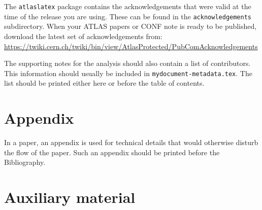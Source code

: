 \documentclass[UKenglish,texlive=2013]{latex/atlasdoc}
\begin{document}
%

The \texttt{atlaslatex} package contains the acknowledgements that were valid 
at the time of the release you are using. These can be found in the
\texttt{acknowledgements} subdirectory.
When your ATLAS papers or CONF note is ready to be published,
download the latest set of acknowledgements from:\\
\url{https://twiki.cern.ch/twiki/bin/view/AtlasProtected/PubComAcknowledgements}

The supporting notes for the analysis should also contain a list of contributors.
This information should usually be included in \texttt{mydocument-metadata.tex}.
The list should be printed either here or before the table of contents.


\clearpage
\appendix
\part*{Appendix}

In a paper, an appendix is used for technical details that would otherwise disturb the flow of the paper.
Such an appendix should be printed before the Bibliography.


\printbibliography
%
%

\clearpage
{}

\clearpage
\appendix
\part*{Auxiliary material}
\end{document}
